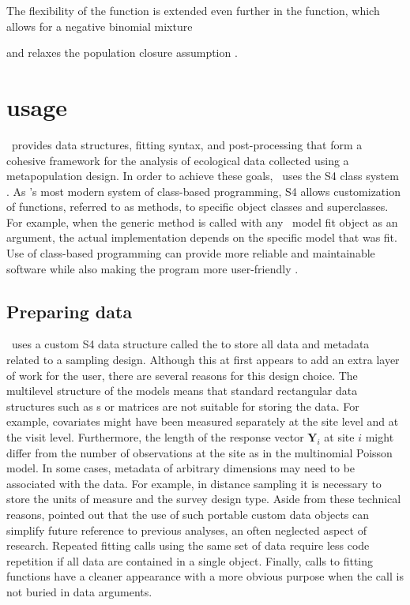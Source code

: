 \documentclass[article,shortnames]{jss}
\newcommand{\um}{\pkg{unmarked}}
\newcommand{\rlang}{\proglang{R}}
\begin{document}
The flexibility of the  function is extended even 
further in the  function, which allows for a negative binomial
mixture {\citep{DorazioEA05} and relaxes the population closure assumption
\citep{chandlerEAip_TempEm}. 

\section[unmarked usage]{ usage}
\label{sec:unmarked-usage}

\um\ provides data structures, fitting syntax, and post-processing that form a
cohesive framework for the analysis of ecological data collected using  
a metapopulation design. In order to achieve these goals, \um\ uses the S4 
class system \citep{Chambers2008}. As \rlang's most modern system of class-based
programming, S4 allows customization of functions, referred to as
methods, to specific object classes and superclasses. For example,
when the generic  method is called with any \um\ model
fit object as an argument, the actual  implementation
depends on the specific model that was fit.  Use of class-based
programming can provide more reliable and maintainable software while
also making the program more user-friendly \citep{Chambers2008}.


\subsection{Preparing data}
\label{sec:data-requirements}

\um\ uses a custom S4 data structure called the 
to store all data and metadata related to a sampling design.  Although this at
first appears to add an extra layer of work for the user, there are
several reasons for this design choice.  The multilevel structure of
the models means that standard rectangular data structures such as 
s or matrices are not suitable for storing the data.  For
example, covariates might have been measured separately at the site
level and at the visit level.  Furthermore, the length of the response
vector $\mathbf Y_{i}$ at site $i$ might differ from the number of
observations at the site as in the multinomial Poisson model.  In some 
cases, metadata of arbitrary dimensions may need to be associated with the 
data.  For example, in distance sampling it is necessary to store the units 
of measure and the survey design type.  Aside
from these technical reasons, \citet{Gentleman2009} pointed out that
the use of such portable custom data objects can simplify future
reference to previous analyses, an often neglected aspect of research.
Repeated fitting calls using the same set of data require less code
repetition if all data are contained in a single object.  Finally,
calls to fitting functions have a cleaner appearance with a more
obvious purpose when the call is not buried in data arguments.  

}
\end{document}
